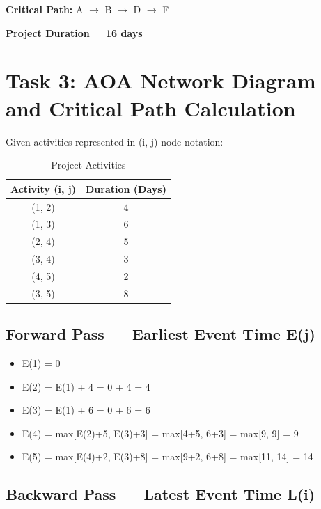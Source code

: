 \documentclass[10pt,a4paper]{article}
\begin{document}
\noindent\textbf{Critical Path:} A $\to$ B $\to$ D $\to$ F

\noindent\textbf{Project Duration = 16 days}

\newpage
\section*{Task 3: AOA Network Diagram and Critical Path Calculation}

Given activities represented in (i, j) node notation:

\begin{table}[h!]
\centering
\renewcommand{\arraystretch}{1.15}
\begin{tabular}{|c|c|}
\hline
\textbf{Activity (i, j)} & \textbf{Duration (Days)} \\ \hline
(1, 2) & 4 \\ \hline
(1, 3) & 6 \\ \hline
(2, 4) & 5 \\ \hline
(3, 4) & 3 \\ \hline
(4, 5) & 2 \\ \hline
(3, 5) & 8 \\ \hline
\end{tabular}
\caption*{Project Activities}
\end{table}

\subsection*{Forward Pass --- Earliest Event Time E(j)}

\begin{itemize}[nosep]
    \item E(1) = 0
    \item E(2) = E(1) + 4 = 0 + 4 = 4
    \item E(3) = E(1) + 6 = 0 + 6 = 6
    \item E(4) = max[E(2)+5, E(3)+3] = max[4+5, 6+3] = max[9, 9] = 9
    \item E(5) = max[E(4)+2, E(3)+8] = max[9+2, 6+8] = max[11, 14] = 14
\end{itemize}

\subsection*{Backward Pass --- Latest Event Time L(i)}
\end{document}
